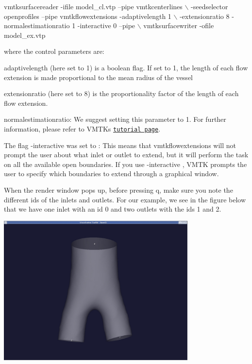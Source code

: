 \begin{DoxyCode}
vmtksurfacereader -ifile model\_cl.vtp --pipe vmtkcenterlines \(\backslash\)
-seedselector openprofiles --pipe vmtkflowextensions -adaptivelength 1 \(\backslash\)
-extensionratio 8 -normalestimationratio 1 -interactive 0 --pipe \(\backslash\)
vmtksurfacewriter -ofile model\_ex.vtp
\end{DoxyCode}


where the control parameters are\+:


\begin{DoxyItemize}
\item {\ttfamily adaptivelength} (here set to 1) is a boolean flag. If set to 1, the length of each flow extension is made proportional to the mean radius of the vessel
\item {\ttfamily extensionratio} (here set to 8) is the proportionality factor of the length of each flow extension.
\item {\ttfamily normalestimationratio\+:} We suggest setting this parameter to 1. For further information, please refer to V\+M\+TK\textquotesingle{}s \href{http://www.vmtk.org}{\tt tutorial page}.
\item The flag {\ttfamily -\/interactive} was set to {}\+: This means that {\ttfamily vmtkflowextensions} will not prompt the user about what inlet or outlet to extend, but it will perform the task on all the available open boundaries. If you use {\ttfamily -\/interactive} {}, V\+M\+TK prompts the user to specify which boundaries to extend through a graphical window.
\end{DoxyItemize}

When the render window pops up, before pressing {\ttfamily q}, make sure you note the different ids of the inlets and outlets. For our example, we see in the figure below that we have one inlet with an id 0 and two outlets with the ids 1 and 2.

 
\begin{DoxyImageNoCaption}
  \mbox{\includegraphics[width=0.75\textwidth]{extension1}}
\end{DoxyImageNoCaption}


